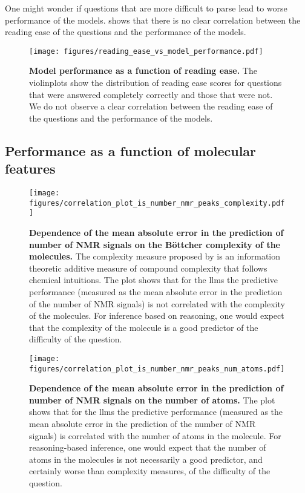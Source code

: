 One might wonder if questions that are more difficult to parse lead to worse performance of the models.
 shows that there is no clear correlation between the reading ease of the questions and the performance of the models.

\begin{figure}
    \centering
    \hspace*{-1cm}
    \texttt{[image: figures/reading\_ease\_vs\_model\_performance.pdf]}
    \caption{\textbf{Model performance as a function of reading ease.} The violinplots show the distribution of reading ease scores for questions that were answered completely correctly and those that were not. We do not observe a clear correlation between the reading ease of the questions and the performance of the models. }
    \label{fig:reading_ease_vs_model_performance}
\end{figure}


\subsection{Performance as a function of molecular features}

\begin{figure}
    \centering 
    \texttt{[image: figures/correlation\_plot\_is\_number\_nmr\_peaks\_complexity.pdf]}
    \caption{\textbf{Dependence of the mean absolute error in the prediction of number of NMR signals on the Böttcher complexity of the molecules.} The complexity measure proposed by \textcite{B_ttcher_2016} is an information theoretic additive measure of compound complexity that follows chemical intuitions.
    The plot shows that for the \glspl{llm} the predictive performance (measured as the mean absolute error in the prediction of the number of NMR signals) is not correlated with the complexity of the molecules. For inference based on reasoning, one would expect that the complexity of the molecule is a good predictor of the difficulty of the question.}
    \label{fig:correlation_plot_is_number_nmr_peaks_complexity}
\end{figure}

\begin{figure}
    \centering
    \texttt{[image: figures/correlation\_plot\_is\_number\_nmr\_peaks\_num\_atoms.pdf]}
    \caption{\textbf{Dependence of the mean absolute error in the prediction of number of NMR signals on the number of atoms.} The plot shows that for the \glspl{llm} the predictive performance (measured as the mean absolute error in the prediction of the number of NMR signals) is correlated with the number of atoms in the molecule. 
    For reasoning-based inference, one would expect that the number of atoms in the molecules is not necessarily a good predictor, and certainly worse than complexity measures, of the difficulty of the question.}
    \label{fig:correlation_plot_is_number_nmr_peaks_num_atoms}
\end{figure}


